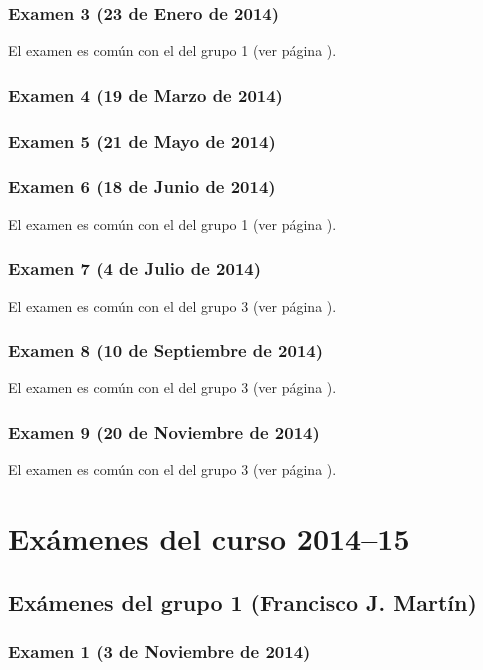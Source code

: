 \documentclass[a4paper,12pt,twoside]{book}
\begin{document}
\subsection{Examen 3 (23 de Enero de 2014)}
El examen es común con el del grupo 1 (ver página \pageref{examen_13_14_1_3}).
\subsection{Examen 4 (19 de Marzo de 2014)}
\subsection{Examen 5 (21 de Mayo de 2014)}
\subsection{Examen 6 (18 de Junio de 2014)}
El examen es común con el del grupo 1 (ver página \pageref{examen_13_14_1_6}).
\subsection{Examen 7 (4 de Julio de 2014)}
El examen es común con el del grupo 3 (ver página \pageref{examen_13_14_3_7}). 
\subsection{Examen 8 (10 de Septiembre de 2014)}
El examen es común con el del grupo 3 (ver página \pageref{examen_13_14_3_8}). 
\subsection{Examen 9 (20 de Noviembre de 2014)}
El examen es común con el del grupo 3 (ver página \pageref{examen_13_14_3_9}). 

\chapter{Exámenes del curso 2014--15}

\section{Exámenes del grupo 1 (Francisco J. Martín)}
\subsection{Examen 1 (3 de Noviembre de 2014)}
\end{document}
